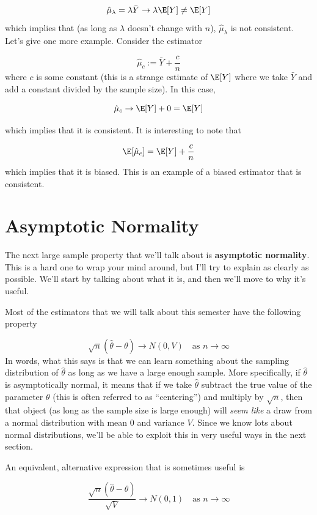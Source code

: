 \documentclass[
  letterpaper,
  DIV=11,
  numbers=noendperiod]{scrreprt}
\begin{document}
\[
  \hat{\mu}_\lambda = \lambda \bar{Y} \rightarrow \lambda \E[Y] \neq \E[Y]
\] which implies that (as long as \(\lambda\) doesn't change with
\(n\)), \(\hat{\mu}_{\lambda}\) is not consistent. Let's give one more
example. Consider the estimator

\[
  \hat{\mu}_c := \bar{Y} + \frac{c}{n}
\] where \(c\) is some constant (this is a strange estimate of \(\E[Y]\)
where we take \(\bar{Y}\) and add a constant divided by the sample
size). In this case,

\[
  \hat{\mu}_c \rightarrow \E[Y] + 0 = \E[Y]
\]

which implies that it is consistent. It is interesting to note that

\[
  \E[\hat{\mu}_c] = \E[Y] + \frac{c}{n}
\] which implies that it is biased. This is an example of a biased
estimator that is consistent.

\section{Asymptotic Normality}\label{asymptotic-normality}

The next large sample property that we'll talk about is
\textbf{asymptotic normality}. This is a hard one to wrap your mind
around, but I'll try to explain as clearly as possible. We'll start by
talking about what it is, and then we'll move to why it's useful.

Most of the estimators that we will talk about this semester have the
following property

\[
  \sqrt{n}\left( \hat{\theta} - \theta \right) \rightarrow N(0,V) \quad \textrm{as } n \rightarrow \infty
\] In words, what this says is that we can learn something about the
sampling distribution of \(\hat{\theta}\) as long as we have a large
enough sample. More specifically, if \(\hat{\theta}\) is asymptotically
normal, it means that if we take \(\hat{\theta}\) subtract the true
value of the parameter \(\theta\) (this is often referred to as
``centering'') and multiply by \(\sqrt{n}\), then that object (as long
as the sample size is large enough) will \emph{seem like} a draw from a
normal distribution with mean 0 and variance \(V\). Since we know lots
about normal distributions, we'll be able to exploit this in very useful
ways in the next section.

An equivalent, alternative expression that is sometimes useful is

\[
  \frac{\sqrt{n}\left( \hat{\theta} - \theta\right)}{\sqrt{V}} \rightarrow N(0,1) \quad \textrm{as } n \rightarrow \infty
\]
\end{document}

